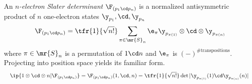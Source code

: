 \documentclass[11pt,fleqn]{article}
\numberwithin{equation}{section}
\begin{document}
\begin{dfn}\label{slater-determinant}
An \textit{$n$-electron Slater determinant} $\F_{(p_1\cd p_n)}$ is a normalized antisymmetric product of $n$ one-electron states $\y_{p_1},\cd,\y_{p_n}$
\begin{align}
&&
  \F_{(p_1\cd p_n)}
=
  \tfr{1}{\sqrt{n!}}
  \sum_{\pi\in\mr{S}_n}
  \e_{\pi}
  \y_{p_{\pi(1)}}\otimes\cd\otimes\y_{p_{\pi(n)}}
\end{align}
where $\pi\in\mr{S}_n$ is a permutation of $1\cd n$ and $\e_{\pi}$ is $(-)^{\text{\# transpositions}}$.
Projecting into position space yields its familiar form.
\begin{align*}
&&
  \ip{1\otimes\cd\otimes n|\F_{(p_1\cd p_n)}}
=
  \F_{(p_1\cd p_n)}(1,\cd,n)
=
  \tfr{1}{\sqrt{n!}}
  \det|\y_{p_{\pi(1)}}(1)\cd\y_{p_{\pi(n)}}(n)|
\end{align*}
\end{dfn}
\end{document}
